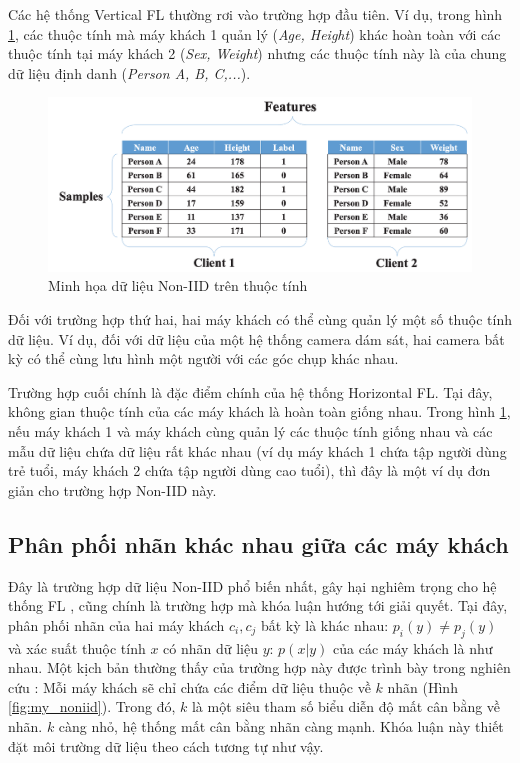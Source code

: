 Các hệ thống Vertical FL thường rơi vào trường hợp đầu tiên. Ví dụ, trong hình \ref{fig:vertical_fl}, các thuộc tính mà máy khách 1 quản lý (\textit{Age, Height}) khác hoàn toàn với các thuộc tính tại máy khách 2 (\textit{Sex, Weight}) nhưng các thuộc tính này là của chung dữ liệu định danh (\textit{Person A, B, C,...}).

\begin{figure}
    \centering
    \includegraphics[scale=0.6]{../images/vertical_fl.png}
    \caption{Minh họa dữ liệu Non-IID trên thuộc tính \cite{zhu2021federated}}
    \label{fig:vertical_fl}
\end{figure}

Đối với trường hợp thứ hai, hai máy khách có thể cùng quản lý một số thuộc tính dữ liệu. Ví dụ, đối với dữ liệu của một hệ thống camera dám sát, hai camera bất kỳ có thể cùng lưu hình một người với các góc chụp khác nhau.

Trường hợp cuối chính là đặc điểm chính của hệ thống Horizontal FL. Tại đây, không gian thuộc tính của các máy khách là hoàn toàn giống nhau. Trong hình \ref{fig:vertical_fl}, nếu máy khách 1 và máy khách cùng quản lý các thuộc tính giống nhau và các mẫu dữ liệu chứa dữ liệu rất khác nhau (ví dụ máy khách 1 chứa tập người dùng trẻ tuổi, máy khách 2 chứa tập người dùng cao tuổi), thì đây là một ví dụ đơn giản cho trường hợp Non-IID này.

\subsection{Phân phối nhãn khác nhau giữa các máy khách}

Đây là trường hợp dữ liệu Non-IID phổ biến nhất, gây hại nghiêm trọng cho hệ thống FL \cite{zhu2021federated}, cũng chính là trường hợp mà khóa luận hướng tới giải quyết. Tại đây, phân phối nhãn của hai máy khách $c_i, c_j$ bất kỳ là khác nhau: $p_i(y) \ne p_j(y)$ và xác suất thuộc tính $x$ có nhãn dữ liệu $y$: $p(x|y)$ của các máy khách là như nhau. Một kịch bản thường thấy của trường hợp này được trình bày trong nghiên cứu \cite{mcmahan2017communication}: Mỗi máy khách sẽ chỉ chứa các điểm dữ liệu thuộc về $k$ nhãn (Hình \ref{fig:my_noniid}). Trong đó, $k$ là một siêu tham số biểu diễn độ mất cân bằng về nhãn. $k$ càng nhỏ, hệ thống mất cân bằng nhãn càng mạnh. Khóa luận này thiết đặt môi trường dữ liệu theo cách tương tự như vậy.

